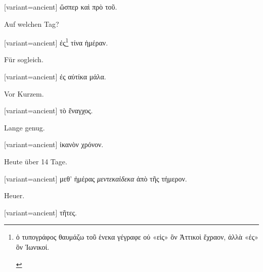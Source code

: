 \switchcolumn

\begin{greek}[variant=ancient]%
ὥσπερ καὶ πρὸ τοῦ.

\end{greek}%
\switchcolumn*

Auf welchen Tag?

\switchcolumn

\begin{greek}[variant=ancient]%
ἐς\footnote{\begin{latin}%
\textgreek[variant=ancient]{ὁ τυπογράφος θαυμάζω τοῦ ἑνεκα γέγραφε
οὐ «εἰς» ὃν Ἀττικοὶ ἔχραον, ἀλλὰ «ἐς» ὃν Ἰωνικοί.}\end{latin}%
} τίνα ἡμέραν.

\end{greek}%
\switchcolumn*

Für sogleich.

\switchcolumn

\begin{greek}[variant=ancient]%
ἐς αὐτίκα μάλα.

\end{greek}%
\switchcolumn*

Vor Kurzem.

\switchcolumn

\begin{greek}[variant=ancient]%
τὸ ἔναγχος.

\end{greek}%
\switchcolumn*

Lange genug.

\switchcolumn

\begin{greek}[variant=ancient]%
ἰκανὸν χρόνον.

\end{greek}%
\switchcolumn*

Heute über 14 Tage.

\switchcolumn

\begin{greek}[variant=ancient]%
μεθ' ἡμέρας \emph{μεντεκαὶδεκα} ἀπὸ τῆς τήμερον.

\end{greek}%
\switchcolumn*

Heuer.

\switchcolumn

\begin{greek}[variant=ancient]%
τῆτες.

\end{greek}%
\switchcolumn*


